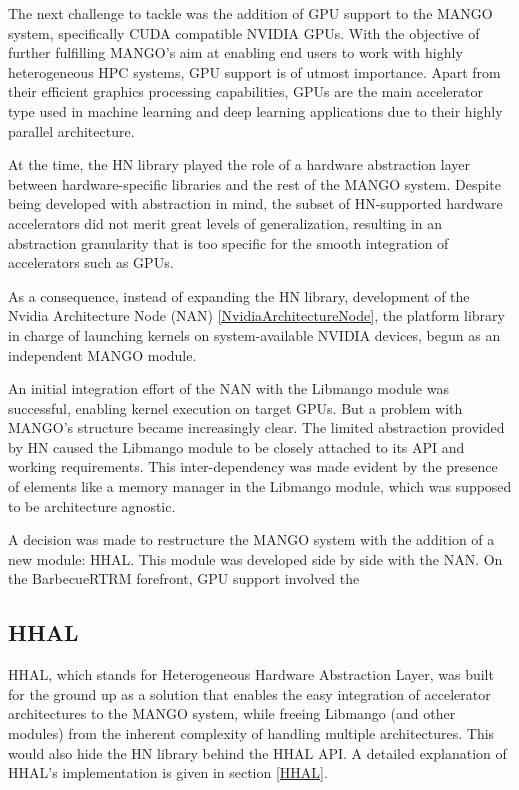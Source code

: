 The next challenge to tackle was the addition of GPU support to the MANGO system, specifically CUDA compatible NVIDIA GPUs. 
With the objective of further fulfilling MANGO's aim at enabling end users to work with highly heterogeneous HPC systems, GPU support is of utmost importance. Apart from their efficient graphics processing capabilities, GPUs are the main accelerator type used in machine learning and deep learning applications due to their highly parallel architecture.

At the time, the HN library played the role of a hardware abstraction layer between hardware-specific libraries and the rest of the MANGO system. Despite being developed with abstraction in mind, the subset of HN-supported hardware accelerators did not merit great levels of generalization, resulting in an abstraction granularity that is too specific for the smooth integration of accelerators such as GPUs.

As a consequence, instead of expanding the HN library, development of the Nvidia Architecture Node (NAN) \ref{NvidiaArchitectureNode}, the platform library in charge of launching kernels on system-available NVIDIA devices, begun as an independent MANGO module.

An initial integration effort of the NAN with the Libmango module was successful, enabling kernel execution on target GPUs. 
But a problem with MANGO's structure became increasingly clear. The limited abstraction provided by HN caused the Libmango module to be closely attached to its API and working requirements. This inter-dependency was made evident by the presence of elements like a memory manager in the Libmango module, which was supposed to be architecture agnostic.

A decision was made to restructure the MANGO system with the addition of a new module: HHAL. This module was developed side by side with the NAN.
On the BarbecueRTRM forefront, GPU support involved the 

\subsection{HHAL}

HHAL, which stands for Heterogeneous Hardware Abstraction Layer, was built for the ground up as a solution that enables the easy integration of accelerator architectures to the MANGO system, while freeing Libmango (and other modules) from the inherent complexity of handling multiple architectures. This would also hide the HN library behind the HHAL API.
A detailed explanation of HHAL's implementation is given in section \ref{HHAL}.

